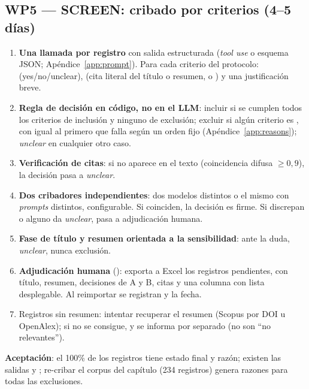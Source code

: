 \documentclass[11pt,a4paper]{article}
\newcommand{\WP}[1]{\textbf{\textcolor{palet}{WP#1}}}
\begin{document}
\subsection*{\WP{5} — SCREEN: cribado por criterios (4--5 días)}
\begin{enumerate}
  \item \textbf{Una llamada por registro} con salida estructurada (\emph{tool use} o esquema JSON; Apéndice~\ref{app:prompt}). Para cada criterio del protocolo:  (yes/no/unclear),  (cita literal del título o resumen, o ) y una justificación breve.
  \item \textbf{Regla de decisión en código, no en el LLM}: incluir si se cumplen todos los criterios de inclusión y ninguno de exclusión; excluir si algún criterio es , con  igual al primero que falla según un orden fijo (Apéndice~\ref{app:reasons}); \emph{unclear} en cualquier otro caso.
  \item \textbf{Verificación de citas}: si  no aparece en el texto (coincidencia difusa $\ge 0{,}9$), la decisión pasa a \emph{unclear}.
  \item \textbf{Dos cribadores independientes}: dos modelos distintos o el mismo con \emph{prompts} distintos, configurable. Si coinciden, la decisión es firme. Si discrepan o alguno da \emph{unclear}, pasa a adjudicación humana.
  \item \textbf{Fase de título y resumen orientada a la sensibilidad}: ante la duda, \emph{unclear}, nunca exclusión.
  \item \textbf{Adjudicación humana} (): exporta a Excel los registros pendientes, con título, resumen, decisiones de A y B, citas y una columna  con lista desplegable. Al reimportar se registran  y la fecha.
  \item Registros sin resumen: intentar recuperar el resumen (Scopus por DOI u OpenAlex); si no se consigue,  y se informa por separado (no son ``no relevantes'').
\end{enumerate}
\textbf{Aceptación}: el 100\% de los registros tiene estado final y razón; existen las salidas  y ; re-cribar el corpus del capítulo (234 registros) genera razones para todas las exclusiones.

\end{document}
